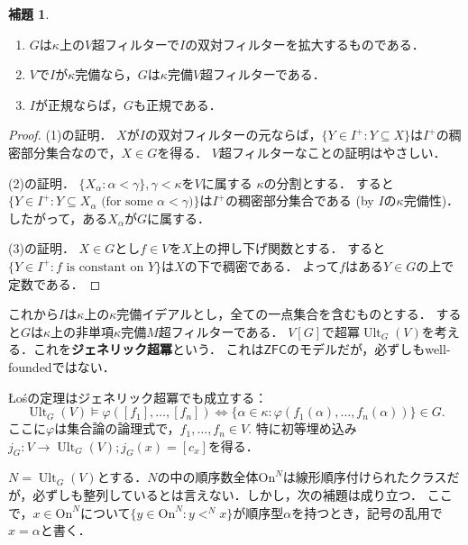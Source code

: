 \documentclass[uplatex]{jsarticle}
\newcommand{\Ordinals}{\mathrm{On}}
\newcommand{\ZFC}{\mathsf{ZFC}}
\newcommand{\Ult}{\operatorname{Ult}}
\renewcommand\subset{\subseteq}
\theoremstyle{definition}
\newtheorem{lem}[thm]{補題}
\begin{document}
	\begin{lem}
		\begin{enumerate}
			\item $G$は$\kappa$上の$V$超フィルターで$I$の双対フィルターを拡大するものである．
			\item $V$で$I$が$\kappa$完備なら，$G$は$\kappa$完備$V$超フィルターである．
			\item $I$が正規ならば，$G$も正規である．
		\end{enumerate}
	\end{lem}
	\begin{proof}
		(1)の証明．
		$X$が$I$の双対フィルターの元ならば，$\{ Y \in I^+ : Y \subset X \}$は$I^+$の稠密部分集合なので，$X \in G$を得る．
		$V$超フィルターなことの証明はやさしい．
		
		(2)の証明．
		$\{ X_\alpha : \alpha < \gamma \}, \gamma < \kappa$を$V$に属する $\kappa$の分割とする．
		すると$\{ Y \in I^+ : Y \subset X_\alpha \text{ (for some $\alpha < \gamma$)}\}$は$I^+$の稠密部分集合である (by $I$の$\kappa$完備性)．したがって，ある$X_\alpha$が$G$に属する．
		
		(3)の証明．
		$X \in G$とし$f \in V$を$X$上の押し下げ関数とする．
		すると$\{ Y \in I^+ : \text{$f$ is constant on $Y$} \}$は$X$の下で稠密である．
		よって$f$はある$Y \in G$の上で定数である．
	\end{proof}

	これから$I$は$\kappa$上の$\kappa$完備イデアルとし，全ての一点集合を含むものとする．
	すると$G$は$\kappa$上の非単項$\kappa$完備$M$超フィルターである．
	$V[G]$で超冪$\Ult_G(V)$を考える．これを\textbf{ジェネリック超冪}という．
	これは$\ZFC$のモデルだが，必ずしもwell-foundedではない．
	
	Łośの定理はジェネリック超冪でも成立する：
	\[
	\Ult_G(V) \models \varphi([f_1], \dots, [f_n]) \iff \{ \alpha \in \kappa : \varphi(f_1(\alpha), \dots, f_n(\alpha)) \} \in G.
	\]
	ここに$\varphi$は集合論の論理式で，$f_1, \dots, f_n \in V$.
	特に初等埋め込み$j_G \colon V \to \Ult_G(V); j_G(x) = [c_x]$を得る．
	
	$N = \Ult_G(V)$とする．$N$の中の順序数全体$\Ordinals^N$は線形順序付けられたクラスだが，必ずしも整列しているとは言えない．しかし，次の補題は成り立つ．
	ここで，$x \in \Ordinals^N$について$\{ y \in \Ordinals^N : y <^N x \}$が順序型$\alpha$を持つとき，記号の乱用で$x = \alpha$と書く．
	
\end{document}
